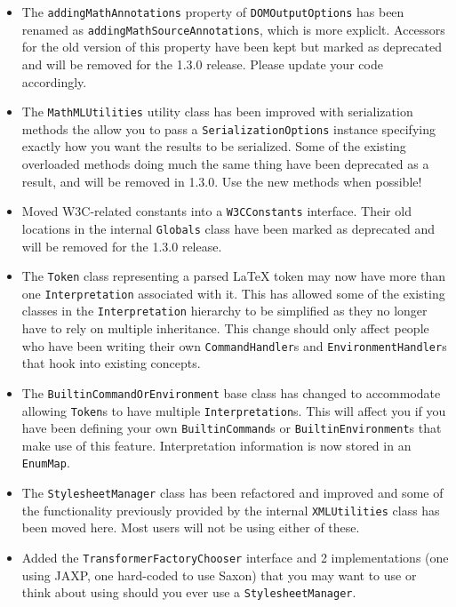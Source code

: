 \begin{itemize}
\item The \verb|addingMathAnnotations| property of \verb|DOMOutputOptions| has been renamed
as \verb|addingMathSourceAnnotations|, which is more expliclt. Accessors for the old version
of this property have been kept but marked as deprecated and will be removed for the 1.3.0 release.
Please update your code accordingly.

\item The \verb|MathMLUtilities| utility class has been improved with serialization methods
the allow you to pass a \verb|SerializationOptions| instance specifying exactly how you want
the results to be serialized. Some of the existing overloaded methods doing much the same thing
have been deprecated as a result, and will be removed in 1.3.0. Use the new methods when possible!


\item Moved W3C-related constants into a \verb|W3CConstants| interface. Their old locations in
the internal \verb|Globals| class have been marked as deprecated and will be removed for the 1.3.0 release.

\item The \verb|Token| class representing a parsed LaTeX token may now have more than one
\verb|Interpretation| associated with it. This has allowed some of the existing classes in
the \verb|Interpretation| hierarchy to be simplified as they no longer have to rely on multiple
inheritance. This change should only affect people who have been writing their own
\verb|CommandHandler|s and \verb|EnvironmentHandler|s that hook into existing concepts.

\item The \verb|BuiltinCommandOrEnvironment| base class has changed to accommodate allowing
\verb|Token|s to have multiple \verb|Interpretation|s. This will affect you if you have been
defining your own \verb|BuiltinCommand|s or \verb|BuiltinEnvironment|s that make use of this feature.
Interpretation information is now stored in an \verb|EnumMap|.

\item The \verb|StylesheetManager| class has been refactored and improved and some of the
functionality previously provided by the internal \verb|XMLUtilities| class has been moved here.
Most users will not be using either of these.

\item Added the \verb|TransformerFactoryChooser| interface and 2 implementations (one using JAXP,
one hard-coded to use Saxon) that you may want to use or think about using should you ever use
a \verb|StylesheetManager|.

\end{itemize}

